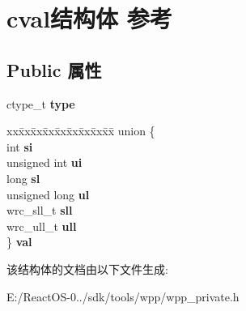 \hypertarget{structcval}{}\section{cval结构体 参考}
\label{structcval}
\subsection*{Public 属性}
\begin{DoxyCompactItemize}
\item 
\mbox{\label{structcval_afa0f071f28e2e26e153e1c74afbe0337}} 
ctype\+\_\+t {\bfseries type}
\item 
\mbox{\label{structcval_a723ba84ca334b94847f9c7fd1fcc3df3}} 
\begin{tabbing}
xx\=xx\=xx\=xx\=xx\=xx\=xx\=xx\=xx\=\kill
union \{\\
\>int {\bfseries si}\\
\>unsigned int {\bfseries ui}\\
\>long {\bfseries sl}\\
\>unsigned long {\bfseries ul}\\
\>wrc\_sll\_t {\bfseries sll}\\
\>wrc\_ull\_t {\bfseries ull}\\
\} {\bfseries val}\\

\end{tabbing}\end{DoxyCompactItemize}


该结构体的文档由以下文件生成\+:\begin{DoxyCompactItemize}
\item 
E\+:/\+React\+O\+S-\/0../sdk/tools/wpp/wpp\+\_\+private.\+h\end{DoxyCompactItemize}
